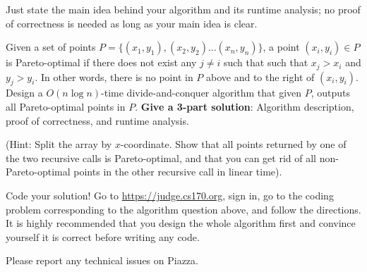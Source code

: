 \documentclass{article}
\begin{document}
Just state the main idea behind your algorithm and its runtime analysis; no proof of
correctness is needed as long as your main idea is clear.


\begin{subparts}

\subpart Given a set of points $P = \{(x_1, y_1), (x_2, y_2) \ldots (x_n, y_n)\}$, a point $(x_i, y_i) \in P$ is Pareto-optimal if there does not exist any $j \neq i$ such that such that $x_j > x_i$ and $y_j > y_i$. In other words, there is no point in $P$ above and to the right of $(x_i, y_i)$. Design a $O(n \log n)$-time divide-and-conquer algorithm that given $P$, outputs all Pareto-optimal points in $P$. \textbf{Give a 3-part solution}: Algorithm description, proof of correctness, and runtime analysis.

(Hint: Split the array by $x$-coordinate. Show that all points returned by one of the two recursive calls is Pareto-optimal, and that you can get rid of all non-Pareto-optimal points in the other recursive call in linear time).

\subpart Code your solution! Go to \href{https://judge.cs170.org}{https://judge.cs170.org}, sign in, go to the coding problem corresponding to the algorithm question above, and follow the directions. It is highly recommended that you design the whole algorithm first and convince yourself it is correct before writing any code.

Please report any technical issues on Piazza.

\end{subparts}
\end{document}
